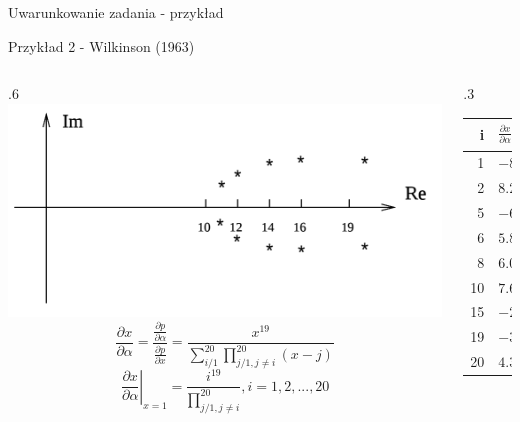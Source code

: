 \begin{frame}{Uwarunkowanie zadania - przykład}
	\begin{exampleblock}{Przykład 2 - Wilkinson (1963)}
    \begin{columns}
    	\begin{column}{.6\linewidth}
          \centering \includegraphics[width=\linewidth]{img/2/2_4_wilkinson_plot}
          \[
              \frac{
                  \partial x
              }{
                  \partial \alpha
              } = \frac{
                  \frac{\partial p}{\partial \alpha}
              }{
                  \frac{\partial p}{\partial x}
              } = \frac{
                  x^{19}
              }{
                  \sum_{i/1}^{20} \prod_{j/1, j \neq i}^{20} (x-j)
              }
          \]
          \[ 
              \left.
                  \frac{\partial x}{\partial \alpha}
              \right|_{x=1} = \frac{
                  i^{19}
              }{
                  \prod_{j/1, j \neq i}^{20}
              }, i = 1, 2, ..., 20
          \]
    	\end{column}
        \begin{column}{.3\linewidth}
          \begin{tabular}{r | l}
              i & $\left.
                  \frac{\partial x}{\partial \alpha}
              \right|_i$ \\
              \hline
               1 & $-8.2 \cdot 10^{-18}$ \\
               2 & $ 8.2 \cdot 10^{-11}$ \\
               5 & $-6.1 \cdot 10^{-1}$  \\
               6 & $ 5.8 \cdot 10^{1}$   \\
               8 & $ 6.0 \cdot 10^{4}$   \\
              10 & $ 7.6 \cdot 10^{6}$   \\
              15 & $-2.1 \cdot 10^{9}$   \\
              19 & $-3.1 \cdot 10^{8}$   \\
              20 & $ 4.3 \cdot 10^{7}$   \\
          \end{tabular}
        \end{column}
    \end{columns}
    \end{exampleblock}
\end{frame}
